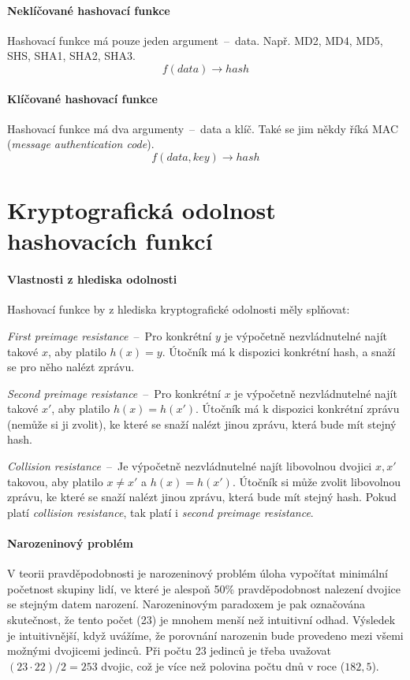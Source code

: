 \paragraph*{Neklíčované hashovací funkce} Hashovací funkce má pouze jeden argument~--~data. Např. MD2, MD4, MD5, SHS, SHA1, SHA2, SHA3. $$f(data) \rightarrow hash$$

\paragraph*{Klíčované hashovací funkce} Hashovací funkce má dva argumenty~--~data a klíč. Také se jim někdy říká MAC (\textit{message authentication code}). $$f(data, key) \rightarrow hash$$


\section{Kryptografická odolnost hashovacích funkcí}

\paragraph*{Vlastnosti z hlediska odolnosti} Hashovací funkce by z hlediska kryptografické odolnosti měly splňovat: \begin{compactitem}
    \item \textit{First preimage resistance}~--~Pro konkrétní $y$ je výpočetně nezvládnutelné najít takové $x$, aby platilo $h(x) = y$. Útočník má k dispozici konkrétní hash, a snaží se pro něho nalézt zprávu.
    \item \textit{Second preimage resistance}~--~Pro konkrétní $x$ je výpočetně nezvládnutelné najít takové $x'$, aby platilo $h(x) = h(x')$. Útočník má k dispozici konkrétní zprávu (nemůže si ji zvolit), ke které se snaží nalézt jinou zprávu, která bude mít stejný hash.
    \item \textit{Collision resistance}~--~Je výpočetně nezvládnutelné najít libovolnou dvojici $x, x'$ takovou, aby platilo $x \neq x'$ a $h(x) = h(x')$. Útočník si může zvolit libovolnou zprávu, ke které se snaží nalézt jinou zprávu, která bude mít stejný hash. Pokud platí \textit{collision resistance}, tak platí i \textit{second preimage resistance}.
\end{compactitem}

\paragraph*{Narozeninový problém} V teorii pravděpodobnosti je narozeninový problém úloha vypočítat minimální početnost skupiny lidí, ve které je alespoň 50\% pravděpodobnost nalezení dvojice se stejným datem narození. Narozeninovým paradoxem je pak označována skutečnost, že tento počet (23) je mnohem menší než intuitivní odhad.
Výsledek je intuitivnější, když uvážíme, že porovnání narozenin bude provedeno mezi všemi možnými dvojicemi jedinců. Při počtu 23 jedinců je třeba uvažovat $(23 \cdot 22) / 2 = 253$ dvojic, což je více než polovina počtu dnů v roce ($182,5$).

